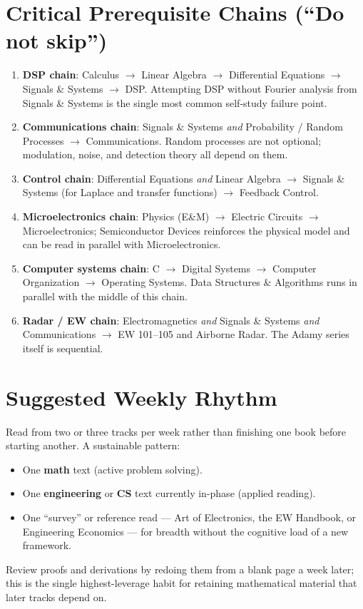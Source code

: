 \documentclass[11pt]{article}
\newcommand{\track}[2]{\textcolor{#1}{\textbf{#2}}}
\begin{document}
\section{Critical Prerequisite Chains (``Do not skip'')}

\begin{enumerate}[leftmargin=1.4em, itemsep=2pt]
  \item \textbf{DSP chain}: Calculus $\to$ Linear Algebra $\to$
        Differential Equations $\to$ Signals \& Systems $\to$ DSP.
        Attempting DSP without Fourier analysis from Signals \& Systems
        is the single most common self-study failure point.
  \item \textbf{Communications chain}: Signals \& Systems \emph{and}
        Probability / Random Processes $\to$ Communications.
        Random processes are not optional; modulation, noise, and
        detection theory all depend on them.
  \item \textbf{Control chain}: Differential Equations \emph{and} Linear
        Algebra $\to$ Signals \& Systems (for Laplace and transfer
        functions) $\to$ Feedback Control.
  \item \textbf{Microelectronics chain}: Physics (E\&M) $\to$ Electric
        Circuits $\to$ Microelectronics; Semiconductor Devices reinforces
        the physical model and can be read in parallel with
        Microelectronics.
  \item \textbf{Computer systems chain}: C $\to$ Digital Systems $\to$
        Computer Organization $\to$ Operating Systems.
        Data Structures \& Algorithms runs in parallel with the middle
        of this chain.
  \item \textbf{Radar / EW chain}: Electromagnetics \emph{and} Signals \&
        Systems \emph{and} Communications $\to$ EW 101--105 and Airborne
        Radar. The Adamy series itself is sequential.
\end{enumerate}

\section{Suggested Weekly Rhythm}

Read from two or three tracks per week rather than finishing one book
before starting another. A sustainable pattern:

\begin{itemize}[leftmargin=1.2em, itemsep=2pt]
  \item One \track{mathcol}{math} text (active problem solving).
  \item One \track{eececol}{engineering} or \track{cscol}{CS} text
        currently in-phase (applied reading).
  \item One ``survey'' or reference read --- Art of Electronics, the EW
        Handbook, or Engineering Economics --- for breadth without the
        cognitive load of a new framework.
\end{itemize}

\noindent Review proofs and derivations by redoing them from a blank page
a week later; this is the single highest-leverage habit for retaining
mathematical material that later tracks depend on.
\end{document}
